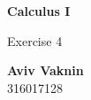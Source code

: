 \documentclass[a4paper, 12pt]{article}
\begin{document}
    \begin{center}
        \vspace*{4.4cm}
            
        \Huge
        \textbf{Calculus I}
            
        \vspace{0.5cm}
        \LARGE
        Exercise 4

        \vfill
            
        \Large
        \textbf{Aviv Vaknin}\\316017128
                    
    \end{center}
\end{document}
